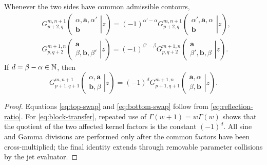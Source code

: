 \begin{theorem}\label{thm:interchanges}
Whenever the two sides have common admissible contours,
\begin{align}
&G_{p+2,q}^{m,n+1}\!\left(
 \left.\begin{matrix}\alpha,\mathbf a,\alpha'\\\mathbf b\end{matrix}\right|z\right)
 =(-1)^{\alpha'-\alpha}
 G_{p+2,q}^{m,n+1}\!\left(
 \left.\begin{matrix}\alpha',\mathbf a,\alpha\\\mathbf b\end{matrix}\right|z\right),\label{eq:top-swap}\\
&G_{p,q+2}^{m+1,n}\!\left(
 \left.\begin{matrix}\mathbf a\\\beta,\mathbf b,\beta'\end{matrix}\right|z\right)
 =(-1)^{\beta'-\beta}
 G_{p,q+2}^{m+1,n}\!\left(
 \left.\begin{matrix}\mathbf a\\\beta',\mathbf b,\beta\end{matrix}\right|z\right).
\label{eq:bottom-swap}
\end{align}
If $d=\beta-\alpha\in\mathbb N$, then
\begin{equation}\label{eq:block-transfer}
G_{p+1,q+1}^{m,n+1}\!\left(
 \left.\begin{matrix}\alpha,\mathbf a\\\mathbf b,\beta\end{matrix}\right|z\right)
=(-1)^d
G_{p+1,q+1}^{m+1,n}\!\left(
 \left.\begin{matrix}\mathbf a,\alpha\\\beta,\mathbf b\end{matrix}\right|z\right).
\end{equation}
\end{theorem}
\begin{proof}
Equations \eqref{eq:top-swap} and \eqref{eq:bottom-swap} follow from
\eqref{eq:reflection-ratio}.  For \eqref{eq:block-transfer}, repeated use of
$\Gamma(w+1)=w\Gamma(w)$ shows that the quotient of the two affected kernel
factors is the constant $(-1)^d$.  All sine and Gamma divisions are performed
only after the common factors have been cross-multiplied; the final identity
extends through removable parameter collisions by the jet evaluator.
\end{proof}

